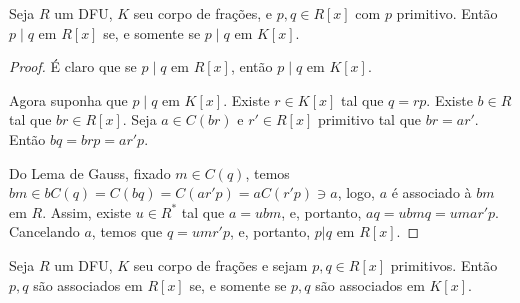     \begin{prop}
        Seja $R$ um DFU, $K$ seu corpo de frações, e $p, q\in R[x]$ com $p$ primitivo. Então $p\mid q$ em $R[x]$ se, e somente se $p\mid q$ em $K[x]$.
    \end{prop}
    \begin{proof}
        É claro que se $p\mid q$ em $R[x]$, então $p\mid q$ em $K[x]$.

        Agora suponha que $p\mid q$ em $K[x]$. Existe $r \in K[x]$ tal que $q=rp$. Existe $b\in R$ tal que $br\in R[x]$. Seja $a \in C(br)$ e $r' \in R[x]$ primitivo tal que $br=ar'$. Então $bq=brp=ar'p$.

        Do Lema de Gauss, fixado $m \in C(q)$, temos $bm\in bC(q)=C(bq)=C(ar'p)=aC(r'p)\ni a$, logo, $a$ é associado à $bm$ em $R$. Assim, existe $u \in R^*$ tal que $a=ubm$, e, portanto, $aq=ubmq=umar'p$. Cancelando $a$, temos que $q=umr'p$, e, portanto, $p|q$ em $R[x]$.
    \end{proof}

    \begin{corol}
        Seja $R$ um DFU, $K$ seu corpo de frações e sejam $p, q \in R[x]$ primitivos.
        Então $p, q$ são associados em $R[x]$ se, e somente se $p, q$ são associados em $K[x]$. 
    \end{corol}

